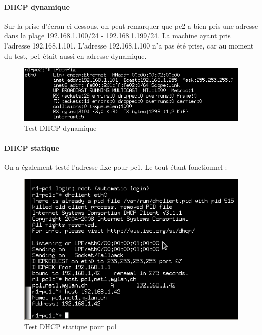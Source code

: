 \documentclass{article}
\begin{document}
\paragraph{DHCP dynamique}

Sur la prise d'écran ci-dessous, on peut remarquer que pc2 a bien pris une adresse dans la plage 192.168.1.100/24 - 192.168.1.199/24. La machine ayant pris l'adresse 192.168.1.101. L'adresse 192.168.1.100 n'a pas été prise, car au moment du test, pc1 était aussi en adresse dynamique.

\begin{figure}[!h]
	\centering
	\includegraphics{./captures/testpc2-dhcp.png}
	\caption{Test DHCP dynamique}
	\label{fig:Test DHCP dynamiqu}
\end{figure}

\paragraph{DHCP statique}

On a également testé l'adresse fixe pour pc1. Le tout étant fonctionnel :

\begin{figure}[!h]
	\centering
	\includegraphics{./captures/7-testfixadress.png}
	\caption{Test DHCP statique pour pc1}
	\label{fig:Test DHCP statique pour pc1}
\end{figure}

\clearpage
\end{document}
